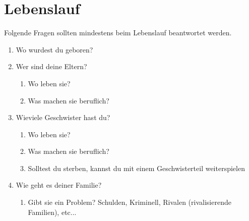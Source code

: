 \section{Lebenslauf}
Folgende Fragen sollten mindestens beim Lebenslauf beantwortet werden.

\begin{enumerate}
\item Wo wurdest du geboren?
\item Wer sind deine Eltern?
	\begin{enumerate}[label=2.\arabic*.]
	\item Wo leben sie?
	\item Was machen sie beruflich?
	\end{enumerate}

\item Wieviele Geschwister hast du?
	\begin{enumerate}[label=3.\arabic*.]
	\item Wo leben sie?
	\item Was machen sie beruflich?
	\item Solltest du sterben, kannst du mit einem Geschwisterteil weiterspielen
	\end{enumerate}

\item Wie geht es deiner Familie?
	\begin{enumerate}[label=4.\arabic*.]
	\item Gibt sie ein Problem? Schulden, Kriminell, Rivalen (rivalisierende Familien), etc...
	\end{enumerate}

\end{enumerate}
